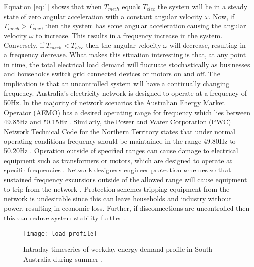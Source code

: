 Equation \ref{eq:1} shows that when $T_{mech}$ equals $T_{elec}$ the system will be in a steady state of zero angular acceleration with a constant angular velocity $\omega$. Now, if $T_{mech} > T_{elec}$, then the system has some angular acceleration causing the angular velocity $\omega$ to increase. This results in a frequency increase in the system. Conversely, if $T_{mech} < T_{elec}$ then the angular velocity $\omega$ will decrease, resulting in a frequency decrease. What makes this situation interesting is that, at any point in time, the total electrical load demand will fluctuate stochastically as businesses and households switch grid connected devices or motors on and off. The implication is that an uncontrolled system will have a continually changing frequency. Australia's electricity network is designed to operate at a frequency of 50$\si{\hertz}$. In the majority of network scenarios the Australian Energy Market Operator (AEMO) has a desired operating range for frequency which lies between 49.85$\si{\hertz}$ and 50.15$\si{\hertz}$ \cite{AEMOfreqdev}. Similarly, the Power and Water Corporation (PWC) Network Technical Code for the Northern Territory states that under normal operating conditions frequency should be maintained in the range 49.80$\si{\hertz}$ to 50.20$\si{\hertz}$ \cite{Pwc2013}. Operation outside of specified ranges can cause damage to electrical equipment such as transformers or motors, which are designed to operate at specific frequencies \cite{Sen2014}. Network designers engineer protection schemes so that sustained frequency excursions outside of the allowed range will cause equipment to trip from the network \cite{AEMOpowerfreqriskrev}. Protection schemes tripping equipment from the network is undesirable since this can leave households and industry without power, resulting in economic loss. Further, if disconnections are uncontrolled then this can reduce system stability further \cite{AEMOpowerfreqriskrev}.

\begin{figure}[ht]
	\centering
	\texttt{[image: load\_profile]}
	\caption{Intraday timeseries of weekday energy demand profile in South Australia during summer \cite{Aemosaenergyrep}.}
	\label{fig:energydemand}
\end{figure}

